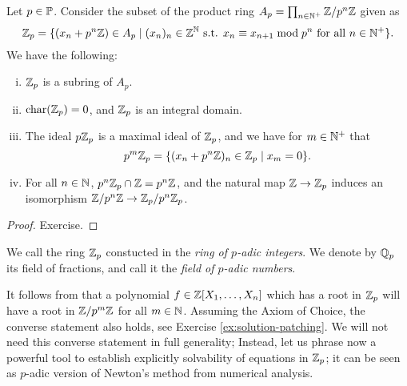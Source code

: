 \documentclass[12pt, leqno, british]{amsart}
\begin{document}
\begin{prop}\label{P:Zp-construction}
Let $p \in \mathbb P$. Consider the subset of the product ring $A_p = \prod_{n \in \mathbb N^+} \mathbb Z/p^n \mathbb Z$ given as
$$ \mathbb Z_p = \lbrace (x_n + p^n\mathbb Z) \in A_p \mid (x_n)_n \in \mathbb Z^\mathbb N \text{ s.t. } x_n \equiv x_{n+1} \bmod p^n \text{ for all } n \in \mathbb N^+ \rbrace.$$
We have the following:
\begin{enumerate}[(i)]
\item $\mathbb Z_p$ is a subring of $A_p$.
\item $\operatorname{char}(\mathbb Z_p) = 0$, and $\mathbb Z_p$ is an integral domain.
\item The ideal $p\mathbb Z_p$ is a maximal ideal of $\mathbb Z_p$, and we have for $m \in \mathbb N^+$ that
$$ p^m\mathbb Z_p = \lbrace (x_n + p^n\mathbb Z)_n \in \mathbb Z_p \mid x_m = 0 \rbrace.$$
\item For all $n \in \mathbb N$, $p^n\mathbb Z_p \cap \mathbb Z = p^n\mathbb Z$, and the natural map $\mathbb Z \to \mathbb Z_p$ induces an isomorphism $\mathbb Z/p^n\mathbb Z \to \mathbb Z_p/p^n\mathbb Z_p$.
\end{enumerate}
\end{prop}
\begin{proof}
Exercise.
\end{proof}
\begin{defi}
We call the ring $\mathbb Z_p$ constucted in  the \emph{ring of $p$-adic integers}.
We denote by $\mathbb Q_p$ its field of fractions, and call it the \emph{field of $p$-adic numbers}.
\end{defi}
It follows from  that a polynomial $f \in \mathbb Z[X_1, \ldots, X_n]$ which has a root in $\mathbb Z_p$ will have a root in $\mathbb Z/p^m\mathbb Z$ for all $m \in \mathbb N$.
Assuming the Axiom of Choice, the converse statement also holds, see Exercise \eqref{ex:solution-patching}.
We will not need this converse statement in full generality;
Instead, let us phrase now a powerful tool to establish explicitly solvability of equations in $\mathbb Z_p$; it can be seen as $p$-adic version of Newton's method from numerical analysis.
\end{document}
